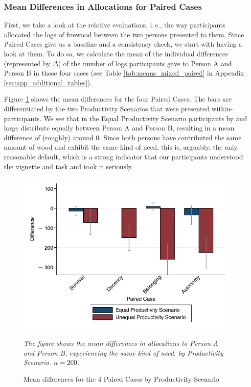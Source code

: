 \documentclass[egregdoesnotlikesansseriftitles]{scrartcl}
\begin{document}
\subsubsection{Mean Differences in Allocations for Paired Cases}\label{sec:results_mean_paired}
First, we take a look at the relative evaluations, i.\,e., the way participants allocated the logs of firewood between the two persons presented to them.
Since Paired Cases give us a baseline and a consistency check, we start with having a look at them.
To do so, we calculate the mean of the individual differences (represented by $\Delta$) of the number of logs participants gave to Person A and Person B in those four cases (see Table \ref{tab:means_mixed_paired} in Appendix \ref{sec:app_additional_tables}).

Figure \ref{fig:overview_paired} shows the mean differences for the four Paired Cases.
The bars are differentiated by the two Productivity Scenarios that were presented within-participants.
We see that in the Equal Productivity Scenario participants by and large distribute equally between Person A and Person B, resulting in a mean difference of (roughly) around $0$.
Since both persons have contributed the same amount of wood and exhibit the same kind of need, this is, arguably, the only reasonable default, which is a strong indicator that our participants understood the vignette and task and took it seriously.

\begin{figure}[t]
   \centering
   \includegraphics[width=.75\textwidth]{figures/figure_4.pdf}
   \begin{minipage}{0.75\linewidth}
   \footnotesize
   \emph{The figure shows the mean differences in allocations to Person A and Person B, experiencing the same kind of need, by Productivity Scenario. $n = 200$.}
   \end{minipage}
   \caption{Mean differences for the 4 Paired Cases by Productivity Scenario}
   \label{fig:overview_paired}
\end{figure}
\end{document}
